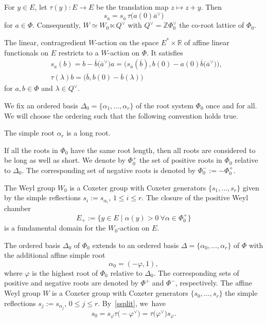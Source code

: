 For $y\in E$, let $\tau(y)\colon E\rightarrow E$ be the translation map $z\mapsto z+y$. Then
\begin{equation}\label{ssplit}
s_a=s_{\overline{a}}\,\tau\bigl(a(0)\overline{a}^\vee\bigr)
\end{equation}
for $a\in\Phi$. Consequently,
$W\simeq W_0\ltimes Q^\vee$ with $Q^\vee=\mathbb{Z}\Phi_0^\vee$ the co-root lattice of $\Phi_0$.

The linear, contragredient $W$-action
on the space $E^*\times\mathbb{R}$ of affine linear functionals on $E$ restricts to a $W$-action on $\Phi$. It satisfies
\begin{align}
&s_a(b)=b-\overline{b}\bigl(\overline{a}^\vee\bigr)a=\bigl(s_{\overline{a}}(\overline{b}),b(0)-a(0)\overline{b}\bigl(\overline{a}^\vee\bigr)\bigr),\nonumber\\
&\tau(\lambda)b=\bigl(\overline{b},b(0)-\overline{b}(\lambda)\bigr)\label{WPhiaction}
\end{align}
for $a,b\in\Phi$ and $\lambda\in Q^\vee$.

We fix an ordered basis $\Delta_0=\{\alpha_1,\dots,\alpha_r\}$ of the root system $\Phi_0$ once and for all. We will choose the ordering such that the following convention
holds true.

\begin{Convention}\label{root_length_convention}
The simple root $\alpha_r$ is a long root.
\end{Convention}

If all the roots in $\Phi_0$ have the same root length, then all roots are considered to be long as well as short.
We denote by $\Phi_0^{+}$ the set of positive roots in $\Phi_0$ relative to $\Delta_0$. The corresponding set of negative roots is denoted by $\Phi_0^-:=-\Phi_0^+$.

The Weyl group $W_0$ is a Coxeter group with Coxeter generators $\{s_1,\dots,s_r\}$ given by the simple reflections $s_i:=s_{\alpha_i}$, $1\leq i\leq r$. The closure of the positive Weyl chamber
\begin{equation*}%
E_+:=\bigl\{y\in E \mid \alpha(y)>0\ \forall \alpha\in\Phi_0^+ \bigr\}
\end{equation*}
is a fundamental domain for the $W_0$-action on $E$.

The ordered basis $\Delta_0$ of $\Phi_0$ extends to an ordered basis
$\Delta=\{\alpha_0,\dots,\alpha_r\}$ of $\Phi$ with the additional affine simple root
\[
\alpha_0=(-\varphi,1),
\]
where $\varphi$ is the highest root of $\Phi_0$ relative to $\Delta_0$. The corresponding sets of positive and negative roots are denoted by $\Phi^+$ and $\Phi^-$, respectively.
The affine Weyl group $W$ is a Coxeter group with Coxeter generators $\{s_0,\dots,s_r\}$ the simple reflections $s_j:=s_{\alpha_j}$, $0\leq j\leq r$. By~\eqref{ssplit}, we~have
\[
s_0=s_\varphi\tau\bigl(-\varphi^\vee\bigr)=\tau\bigl(\varphi^\vee\bigr)s_\varphi.
\]

